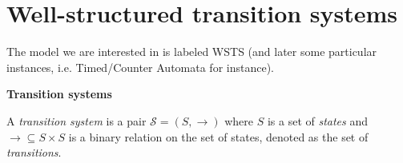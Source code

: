 

\newcommand{\Bad}{\textsf{Bad}}
\newcommand{\Safe}{\textsf{Safe}}


\newcommand{\pred}{\textsf{pred}}
\newcommand{\post}{\textsf{post}}

\section{Well-structured transition systems}\label{section definitions}




The model we are interested in is labeled WSTS (and later some particular instances, i.e. Timed/Counter Automata for instance).



\noindent
{\bf Transition systems}


\begin{definition}
 A {\em transition system} is a pair $\mathscr{S} = (S,\rightarrow )$ where $S$ is a set of 
 {\em states} and  
 $ {\rightarrow} \subseteq S \times S$ is a
 binary relation 
 on
 the set of states, denoted as the set of {\em transitions}. 

\iffalse
\mathieu{ Maybe add this back ?
A {\em labeled transition system} (LTS for short) is a tuple $\mathscr{S}=(S, \Sigma, \rightarrow)$ where 
$S$ is a set of {\em states}, $\Sigma$ is a (finite) set of {\em labels}, and 
${\rightarrow} \subseteq S\times \Sigma \times S$ is a 
ternary relation,
denoted as the set of {\em labeled transitions}. }
\fi
\end{definition}

